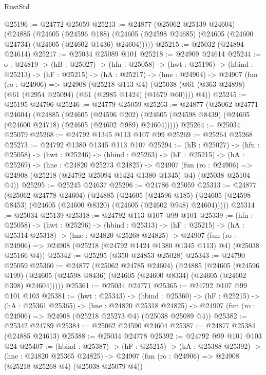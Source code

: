 \begin{lexlean}{RustStd}
\begin{coremodule}
@25196 := @24772 @25059
@25213 := @24877
    (@25062 @25139 @24604)
    (@24885
      (@24605
        (@24596 @188)
        (@24605 (@24598 @24685) (@24605 (@24600 @24734) (@24605 (@24602 @1436) @24604)))))
@25215 := @25032 (@24894 @24614)
@25217 := @25034 @25089 @101
@25218 := @24909 @24614
@25244 := {o : @24819} ->
  (hB : @25027) ->
  (hfn : @25058) ->
  (hwt : @25196) ->
  (hbind : @25213) ->
  (hF : @25215) ->
  (hA : @25217) ->
  (hne : @24904) ->
  @24907
    (fun (ro : @24906) =>
    @24908
      (@25218 @113 @4)
      (@25038 (@61 (@363 @24898) (@61 (@2954 @25094) (@61 (@2985 @1424) (@1679 @60)))) @4))
@25245 := @25195 @24796
@25246 := @24779 @25059
@25263 := @24877
    (@25062 @24771 @24604)
    (@24885
      (@24605
        (@24596 @202)
        (@24605 (@24598 @8439) (@24605 (@24600 @24718) (@24605 (@24602 @989) @24604)))))
@25264 := @25034 @25079
@25268 := @24792 @1345 @113 @107 @99
@25269 := @25264 @25268
@25273 := @24792 @1380 @1345 @113 @107
@25294 := (hB : @25027) ->
  (hfn : @25058) ->
  (hwt : @25246) ->
  (hbind : @25263) ->
  (hF : @25215) ->
  (hA : @25269) ->
  (hne : @24820 @25273 @24825) ->
  @24907
    (fun (ro : @24906) => @24908 (@25218 (@24792 @25094 @1424 @1380 @1345) @4) (@25038 @25104 @4))
@25295 := @25245 @24637
@25296 := @24786 @25059
@25313 := @24877
    (@25062 @24778 @24604)
    (@24885
      (@24605
        (@24596 @185)
        (@24605 (@24598 @8453) (@24605 (@24600 @8320) (@24605 (@24602 @948) @24604)))))
@25314 := @25034 @25139
@25318 := @24792 @113 @107 @99 @101
@25339 := (hfn : @25058) ->
  (hwt : @25296) ->
  (hbind : @25313) ->
  (hF : @25215) ->
  (hA : @25314 @25318) ->
  (hne : @24820 @25268 @24825) ->
  @24907
    (fun (ro : @24906) => @24908 (@25218 (@24792 @1424 @1380 @1345 @113) @4) (@25038 @25166 @4))
@25342 := @25295 (@350 @24853 @25028)
@25343 := @24790 @25059
@25360 := @24877
    (@25062 @24785 @24604)
    (@24885
      (@24605
        (@24596 @199)
        (@24605 (@24598 @8436) (@24605 (@24600 @8334) (@24605 (@24602 @398) @24604)))))
@25361 := @25034 @24771
@25365 := @24792 @107 @99 @101 @103
@25381 := (hwt : @25343) ->
  (hbind : @25360) ->
  (hF : @25215) ->
  (hA : @25361 @25365) ->
  (hne : @24820 @25318 @24825) ->
  @24907 (fun (ro : @24906) => @24908 (@25218 @25273 @4) (@25038 @25089 @4))
@25382 := @25342 @24789
@25384 := @25062 @24590 @24604
@25387 := @24877 @25384 (@24885 @24613)
@25388 := @25034 @24778
@25392 := @24792 @99 @101 @103 @24
@25407 := (hbind : @25387) ->
  (hF : @25215) ->
  (hA : @25388 @25392) ->
  (hne : @24820 @25365 @24825) ->
  @24907 (fun (ro : @24906) => @24908 (@25218 @25268 @4) (@25038 @25079 @4))

\end{coremodule}
\end{lexlean}
